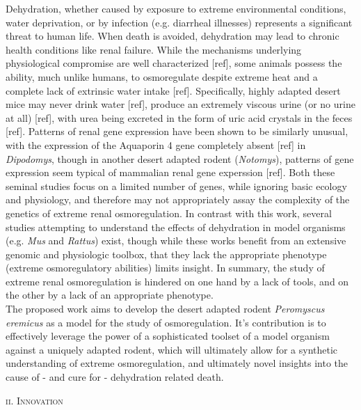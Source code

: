 \documentclass[11pt]{article}
\begin{document}
Dehydration, whether caused by exposure to extreme environmental conditions, water deprivation, or by infection (e.g. diarrheal illnesses) represents a significant threat to human life. When death is avoided, dehydration may lead to chronic health conditions like renal failure. While the mechanisms underlying physiological compromise are well characterized [ref], some animals possess the ability, much unlike humans, to osmoregulate despite extreme heat and a complete lack of extrinsic water intake [ref]. Specifically, highly adapted desert mice may never drink water [ref], produce an extremely viscous urine (or no urine at all) [ref], with urea being excreted in the form of uric acid crystals in the feces [ref]. Patterns of renal gene expression have been shown to be similarly unusual, with the expression of the Aquaporin 4 gene completely absent [ref] in \textit{Dipodomys}, though in another desert adapted rodent (\textit{Notomys}), patterns of gene expression seem typical of mammalian renal gene experssion [ref]. Both these seminal studies focus on a limited number of genes, while ignoring basic ecology and physiology, and therefore may not appropriately assay the complexity of the genetics of extreme renal osmoregulation. In contrast with this work, several studies attempting to understand the effects of dehydration in model organisms (e.g. \textit{Mus} and \textit{Rattus}) exist, though while these works benefit from an extensive genomic and physiologic toolbox, that they lack the appropriate phenotype (extreme osmoregulatory abilities) limits insight. In summary, the study of extreme renal osmoregulation is hindered on one hand by a lack of tools, and on the other by a lack of an appropriate phenotype. \\

The proposed work aims to develop the desert adapted rodent \textit{Peromyscus eremicus} as a model for the study of osmoregulation. It's contribution is to effectively leverage the power of a sophisticated toolset of a model organism against a uniquely adapted rodent, which will ultimately allow for a synthetic understanding of extreme osmoregulation, and ultimately novel insights into the cause of - and cure for - dehydration related death.

\normalsize 
\begin{center}
\textsc{{ii. Innovation}} \\
\end{center}
\end{document}
